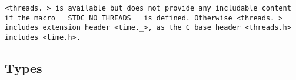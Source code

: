 \def\Subsection#1{\subsection{#1}}

\tt{<threads._>} is available but does not provide any includable
content if the macro \tt{__STDC_NO_THREADS__} is defined.
Otherwise \tt{<threads._>} includes extension header \tt{<time._>},
as the C base header \tt{<threads.h>} includes \tt{<time.h>}.

\Subsection{Types}
